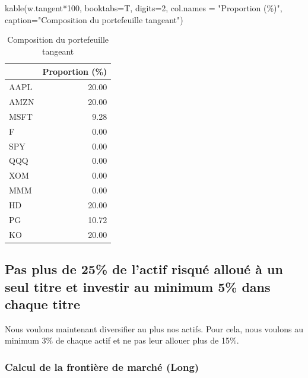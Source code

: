 \documentclass[
]{article}
\newenvironment{Shaded}{\begin{snugshade}}{\end{snugshade}}
\newcommand{\AttributeTok}[1]{\textcolor[rgb]{0.77,0.63,0.00}{#1}}
\newcommand{\DecValTok}[1]{\textcolor[rgb]{0.00,0.00,0.81}{#1}}
\newcommand{\FunctionTok}[1]{\textcolor[rgb]{0.00,0.00,0.00}{#1}}
\newcommand{\NormalTok}[1]{#1}
\newcommand{\SpecialCharTok}[1]{\textcolor[rgb]{0.00,0.00,0.00}{#1}}
\newcommand{\StringTok}[1]{\textcolor[rgb]{0.31,0.60,0.02}{#1}}
\begin{document}
\begin{Shaded}
\begin{Highlighting}[]
\FunctionTok{kable}\NormalTok{(w.tangent}\SpecialCharTok{*}\DecValTok{100}\NormalTok{, }\AttributeTok{booktabs=}\NormalTok{T, }\AttributeTok{digits=}\DecValTok{2}\NormalTok{, }\AttributeTok{col.names =} \StringTok{"Proportion (\%)"}\NormalTok{,}
      \AttributeTok{caption=}\StringTok{"Composition du portefeuille tangeant"}\NormalTok{)}
\end{Highlighting}
\end{Shaded}

\begin{table}

\caption{\label{tab:unnamed-chunk-16}Composition du portefeuille tangeant}
\centering
\begin{tabular}[t]{lr}
\toprule
  & Proportion (\%)\\
\midrule
AAPL & 20.00\\
AMZN & 20.00\\
MSFT & 9.28\\
F & 0.00\\
SPY & 0.00\\
\addlinespace
QQQ & 0.00\\
XOM & 0.00\\
MMM & 0.00\\
HD & 20.00\\
PG & 10.72\\
\addlinespace
KO & 20.00\\
\bottomrule
\end{tabular}
\end{table}

\hypertarget{pas-plus-de-25-de-lactif-risquuxe9-allouuxe9-uxe0-un-seul-titre-et-investir-au-minimum-5-dans-chaque-titre}{%
\subsection{Pas plus de 25\% de l'actif risqué alloué à un seul titre et
investir au minimum 5\% dans chaque
titre}\label{pas-plus-de-25-de-lactif-risquuxe9-allouuxe9-uxe0-un-seul-titre-et-investir-au-minimum-5-dans-chaque-titre}}

Nous voulons maintenant diversifier au plus nos actifs. Pour cela, nous
voulons au minimum 3\% de chaque actif et ne pas leur allouer plus de
15\%.

\hypertarget{calcul-de-la-frontiuxe8re-de-marchuxe9-long-2}{%
\subsubsection{Calcul de la frontière de marché
(Long)}\label{calcul-de-la-frontiuxe8re-de-marchuxe9-long-2}}
\end{document}
